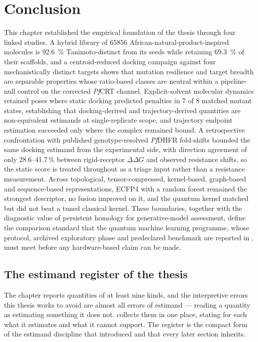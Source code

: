 \section{Conclusion}\label{sec:ch3_conclusion}

This chapter established the empirical foundation of the thesis through four linked studies. A hybrid library of \num{65856} African-natural-product-inspired molecules is \qty{92.6}{\percent} Tanimoto-distinct from its seeds while retaining \qty{69.3}{\percent} of their scaffolds, and a centroid-reduced docking campaign against four mechanistically distinct targets shows that mutation resilience and target breadth are separable properties whose ratio-based classes are neutral within a pipeline-null control on the corrected \emph{Pf}CRT channel. Explicit-solvent molecular dynamics retained poses where static docking predicted penalties in \num{7} of \num{8} matched mutant states, establishing that docking-derived and trajectory-derived quantities are non-equivalent estimands at single-replicate scope, and trajectory endpoint estimation succeeded only where the complex remained bound. A retrospective confrontation with published genotype-resolved \emph{Pf}DHFR fold-shifts bounded the same docking estimand from the experimental side, with direction agreement of only \numrange{28.6}{41.7}\,\% between rigid-receptor $\Delta\Delta G$ and observed resistance shifts, so the static score is treated throughout as a triage input rather than a resistance measurement. Across topological, tensor-compressed, kernel-based, graph-based and sequence-based representations, ECFP4 with a random forest remained the strongest descriptor, no fusion improved on it, and the quantum kernel matched but did not beat a tuned classical kernel. These boundaries, together with the diagnostic value of persistent homology for generative-model assessment, define the comparison standard that the quantum machine learning programme, whose protocol, archived exploratory phase and predeclared benchmark are reported in , must meet before any hardware-based claim can be made.

\subsection{The estimand register of the thesis}\label{sec:res_estimand_register}

The chapter reports quantities of at least nine kinds, and the interpretive errors this thesis works to avoid are almost all errors of estimand --- reading a quantity as estimating something it does not.  collects them in one place, stating for each what it estimates and what it cannot support. The register is the compact form of the estimand discipline that  introduced and that every later section inherits.

